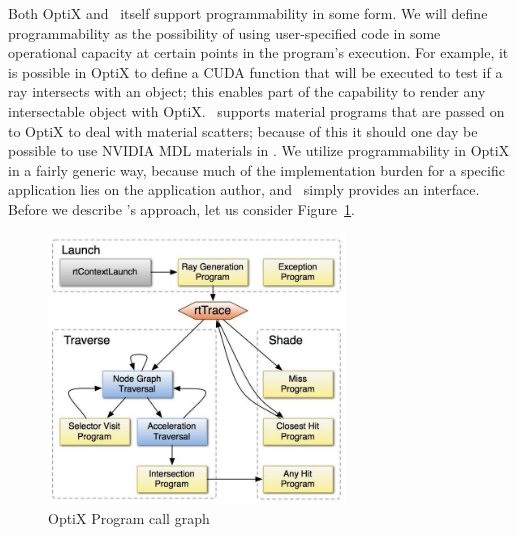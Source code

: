  \label{ch:methods:renderer:parallel:program}

Both OptiX and \name\ itself support programmability in some form.
We will define programmability as the possibility of using user-specified code in some operational capacity at certain points in the program's execution.
For example, it is possible in OptiX to define a CUDA function that will be executed to test if a ray intersects with an object; this enables part of the capability to render any intersectable object with OptiX.
\name\ supports material programs that are passed on to OptiX to deal with material scatters; because of this it should one day be possible to use NVIDIA MDL materials \cite{nvidia2015mdl} in \name.
We utilize programmability in OptiX in a fairly generic way, because much of the implementation burden for a specific application lies on the application author, and \name\ simply provides an interface.
Before we describe \name's approach, let us consider Figure~\ref{fig:rayterm-gpu_optix_trace}.

\vspace{0.3em}
\begin{figure}[htb]
  \centering
  \includegraphics[width=0.7\textwidth]{resources/optix_trace}
  \caption{OptiX Program call graph}
  \label{fig:rayterm-gpu_optix_trace}
\end{figure}


